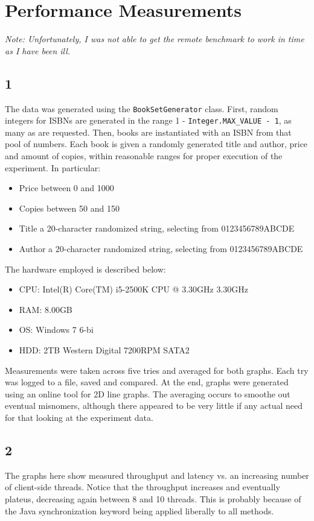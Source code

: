 \section{Performance Measurements}
\textit{Note: Unfortunately, I was not able to get the remote benchmark to work
in time as I have been ill.}

\subsection*{1}
The data was generated using the \texttt{BookSetGenerator} class. First, random
integers for ISBNs are generated in the range 1 - \texttt{Integer.MAX\_VALUE -
1}, as many as are requested. Then, books are instantiated with an ISBN from
that pool of numbers. Each book is given a randomly generated title and author,
price and amount of copies, within reasonable ranges for proper execution of the
experiment. In particular:

\begin{itemize}
    \item Price between 0 and 1000
    \item Copies between 50 and 150
    \item Title a 20-character randomized string, selecting from
        0123456789ABCDE
    \item Author a 20-character randomized string, selecting from
        0123456789ABCDE
\end{itemize}

The hardware employed is described below:
\begin{itemize}
    \item CPU: Intel(R) Core(TM) i5-2500K CPU @ 3.30GHz 3.30GHz
    \item RAM: 8.00GB
    \item OS: Windows 7 6-bi
    \item HDD: 2TB Western Digital 7200RPM SATA2
\end{itemize}

Measurements were taken across five tries and averaged for both graphs. Each try
was logged to a file, saved and compared. At the end, graphs were generated
using an online tool for 2D line graphs. The averaging occurs to smoothe out
eventual misnomers, although there appeared to be very little if any actual need
for that looking at the experiment data.

\subsection*{2}
The graphs here show measured throughput and latency vs. an increasing number of
client-side threads. Notice that the throughput increases and eventually
plateus, decreasing again between 8 and 10 threads. This is probably because of
the Java synchronization keyword being applied liberally to all methods.

